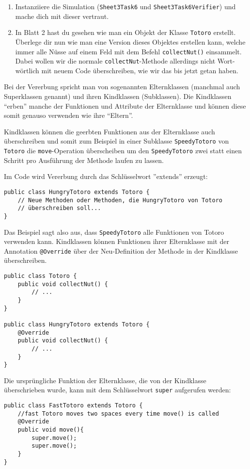 \begin{enumerate}
	\item
	Instanziiere die Simulation (\lstinline{Sheet3Task6} und \lstinline{Sheet3Task6Verifier}) und mache dich mit dieser vertraut.

\item In Blatt 2 hast du gesehen wie man ein Objekt der Klasse \lstinline{Totoro} erstellt.
Überlege dir nun wie man eine Version dieses Objektes erstellen kann, welche immer alle Nüsse auf einem Feld mit dem Befehl \lstinline{collectNut()} einsammelt.
Dabei wollen wir die normale \lstinline{collectNut}-Methode allerdings nicht Wort-wörtlich mit neuem Code überschreiben, wie wir das bis jetzt getan haben.
\end{enumerate}

\begin{Infobox}[Vererbung]

Bei der Vererbung spricht man von sogenannten Elternklassen (manchmal auch Superklassen genannt) und ihren Kindklassen (Subklassen).
Die Kindklassen \enquote{erben} manche der Funktionen und Attribute der Elternklasse und können diese somit genauso verwenden wie ihre \enquote{Eltern}.\newline

Kindklassen können die geerbten Funktionen aus der Elternklasse auch überschreiben und somit zum Beispiel in einer Subklasse \lstinline{SpeedyTotoro} von \lstinline{Totoro} die \lstinline{move}-Operation überscheiben um den \lstinline{SpeedyTotoro} zwei statt einen Schritt pro Ausführung der Methode laufen zu lassen.

Im Code wird Vererbung durch das Schlüsselwort ''extends'' erzeugt:

\begin{lstlisting}[xleftmargin=0.5cm]
public class HungryTotoro extends Totoro {
	// Neue Methoden oder Methoden, die HungryTotoro von Totoro
	// überschreiben soll...
}
\end{lstlisting}

Das Beispiel sagt also aus, dass \lstinline{SpeedyTotoro} alle Funktionen von Totoro verwenden kann.\newline
Kindklassen können Funktionen ihrer Elternklasse mit der Annotation \lstinline{@Override} über der Neu-Definition der Methode in der Kindklasse überschreiben.

\begin{lstlisting}[xleftmargin=0.5cm]
public class Totoro {
	public void collectNut() {
		// ...
	}
}

public class HungryTotoro extends Totoro {
	@Override
	public void collectNut() {
		// ...
	}
}
\end{lstlisting}
Die ursprüngliche Funktion der Elternklasse, die von der Kindklasse überschrieben wurde, kann mit dem Schlüsselwort \lstinline{super} aufgerufen werden:
\begin{lstlisting}[xleftmargin=0.5cm]
public class FastTotoro extends Totoro {
	//fast Totoro moves two spaces every time move() is called
	@Override
	public void move(){
		super.move();
		super.move();
	}
}
\end{lstlisting}
\end{Infobox}


